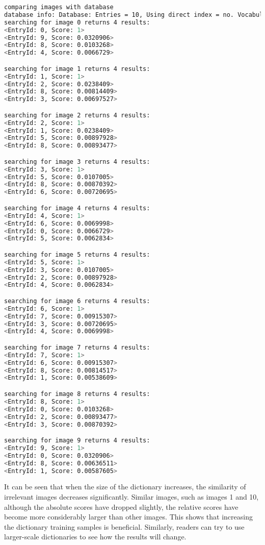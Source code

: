 \begin{lstlisting}[language=sh,caption=Terminal output:]
comparing images with database 
database info: Database: Entries = 10, Using direct index = no. Vocabulary: k = 10, L = 5, Weighting = tf-idf, Scoring = L1-norm, Number of words = 99566
searching for image 0 returns 4 results:
<EntryId: 0, Score: 1>
<EntryId: 9, Score: 0.0320906>
<EntryId: 8, Score: 0.0103268>
<EntryId: 4, Score: 0.0066729>

searching for image 1 returns 4 results:
<EntryId: 1, Score: 1>
<EntryId: 2, Score: 0.0238409>
<EntryId: 8, Score: 0.00814409>
<EntryId: 3, Score: 0.00697527>

searching for image 2 returns 4 results:
<EntryId: 2, Score: 1>
<EntryId: 1, Score: 0.0238409>
<EntryId: 5, Score: 0.00897928>
<EntryId: 8, Score: 0.00893477>

searching for image 3 returns 4 results:
<EntryId: 3, Score: 1>
<EntryId: 5, Score: 0.0107005>
<EntryId: 8, Score: 0.00870392>
<EntryId: 6, Score: 0.00720695>

searching for image 4 returns 4 results:
<EntryId: 4, Score: 1>
<EntryId: 6, Score: 0.0069998>
<EntryId: 0, Score: 0.0066729>
<EntryId: 5, Score: 0.0062834>

searching for image 5 returns 4 results:
<EntryId: 5, Score: 1>
<EntryId: 3, Score: 0.0107005>
<EntryId: 2, Score: 0.00897928>
<EntryId: 4, Score: 0.0062834>

searching for image 6 returns 4 results:
<EntryId: 6, Score: 1>
<EntryId: 7, Score: 0.00915307>
<EntryId: 3, Score: 0.00720695>
<EntryId: 4, Score: 0.0069998>

searching for image 7 returns 4 results:
<EntryId: 7, Score: 1>
<EntryId: 6, Score: 0.00915307>
<EntryId: 8, Score: 0.00814517>
<EntryId: 1, Score: 0.00538609>

searching for image 8 returns 4 results:
<EntryId: 8, Score: 1>
<EntryId: 0, Score: 0.0103268>
<EntryId: 2, Score: 0.00893477>
<EntryId: 3, Score: 0.00870392>

searching for image 9 returns 4 results:
<EntryId: 9, Score: 1>
<EntryId: 0, Score: 0.0320906>
<EntryId: 8, Score: 0.00636511>
<EntryId: 1, Score: 0.00587605>
\end{lstlisting}

It can be seen that when the size of the dictionary increases, the similarity of irrelevant images decreases significantly. Similar images, such as images 1 and 10, although the absolute scores have dropped slightly, the relative scores have become more considerably larger than other images. This shows that increasing the dictionary training samples is beneficial. Similarly, readers can try to use larger-scale dictionaries to see how the results will change.

